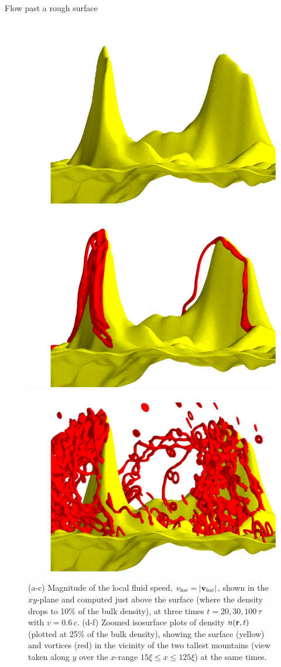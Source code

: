 \begin{chapter}{\label{cha:afm}Flow past a rough surface}
\begin{figure}
{\begin{minipage}{1.1\textwidth}
  \hspace*{0.02\linewidth}\includegraphics[width=0.3\linewidth]{./afm/afm-sub-2102}
  \includegraphics[width=0.3\linewidth]{./afm/afm-sub-3101}
  \includegraphics[width=0.3\linewidth]{./afm/afm-sub-10101}
  \end{minipage}
  }
  \caption{\label{fig:velsandvorts}(a-c) Magnitude of the local fluid speed, $v_{\rm loc}=|{\bf v_{\rm loc}}|$, shown in the $xy$-plane and computed just above the surface (where the
density drops to 10\% of the bulk density), at three times $t=20,30,100\,\tau$ with $v=0.6\,c$.  (d-f) Zoomed isosurface plots of density $n({\bf r},t)$ (plotted at 25\%  of the bulk density), showing the surface (yellow) and vortices (red) in the vicinity of the two tallest mountains (view taken along $y$ over the $x$-range $15 \xi \leq x \leq 125 \xi$) at the same times.  %
}
 \end{figure} 


\end{chapter}
